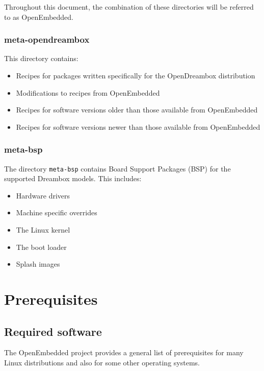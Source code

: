 \documentclass[a4paper]{article}
\newcommand{\shell}[1]{\texttt{\small #1}}
\begin{document}
       Throughout this document, the combination of these directories will be
       referred to as OpenEmbedded.

    \subsubsection{meta-opendreambox}
      This directory contains:

      \begin{itemize}
        \item Recipes for packages written specifically for the OpenDreambox distribution
        \item Modifications to recipes from OpenEmbedded
        \item Recipes for software versions older than those available from OpenEmbedded
        \item Recipes for software versions newer than those available from OpenEmbedded
      \end{itemize}

    \subsubsection{meta-bsp}
      The directory \shell{meta-bsp} contains Board Support Packages (BSP)
      for the supported Dreambox models. This includes:

      \begin{itemize}
        \item Hardware drivers
        \item Machine specific overrides
        \item The Linux kernel
        \item The boot loader
        \item Splash images
      \end{itemize}

\section{Prerequisites}
  \label{prerequisites}

  \subsection{Required software}

   The OpenEmbedded project provides a general list of prerequisites for
   many Linux distributions and also for some other operating systems.
\end{document}
